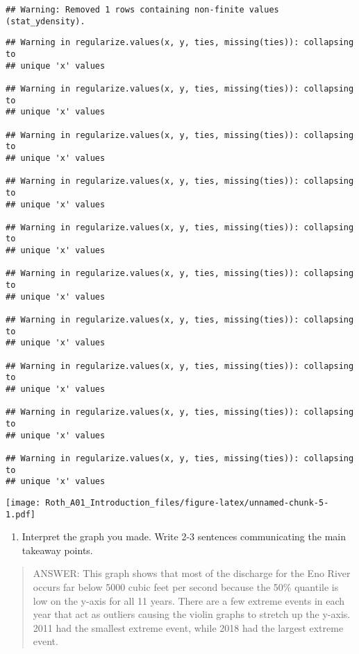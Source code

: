 \documentclass[]{article}
\providecommand{\tightlist}{%
  \setlength{\itemsep}{0pt}\setlength{\parskip}{0pt}}
\begin{document}
\begin{verbatim}
## Warning: Removed 1 rows containing non-finite values (stat_ydensity).
\end{verbatim}

\begin{verbatim}
## Warning in regularize.values(x, y, ties, missing(ties)): collapsing to
## unique 'x' values

## Warning in regularize.values(x, y, ties, missing(ties)): collapsing to
## unique 'x' values

## Warning in regularize.values(x, y, ties, missing(ties)): collapsing to
## unique 'x' values

## Warning in regularize.values(x, y, ties, missing(ties)): collapsing to
## unique 'x' values

## Warning in regularize.values(x, y, ties, missing(ties)): collapsing to
## unique 'x' values

## Warning in regularize.values(x, y, ties, missing(ties)): collapsing to
## unique 'x' values

## Warning in regularize.values(x, y, ties, missing(ties)): collapsing to
## unique 'x' values

## Warning in regularize.values(x, y, ties, missing(ties)): collapsing to
## unique 'x' values

## Warning in regularize.values(x, y, ties, missing(ties)): collapsing to
## unique 'x' values

## Warning in regularize.values(x, y, ties, missing(ties)): collapsing to
## unique 'x' values
\end{verbatim}

\texttt{[image: Roth\_A01\_Introduction\_files/figure-latex/unnamed-chunk-5-1.pdf]}

\begin{enumerate}
\def\labelenumi{\arabic{enumi}.}
\setcounter{enumi}{11}
\tightlist
\item
  Interpret the graph you made. Write 2-3 sentences communicating the
  main takeaway points.
\end{enumerate}

\begin{quote}
ANSWER: This graph shows that most of the discharge for the Eno River
occurs far below 5000 cubic feet per second because the 50\% quantile is
low on the y-axis for all 11 years. There are a few extreme events in
each year that act as outliers causing the violin graphs to stretch up
the y-axis. 2011 had the smallest extreme event, while 2018 had the
largest extreme event.
\end{quote}
\end{document}
